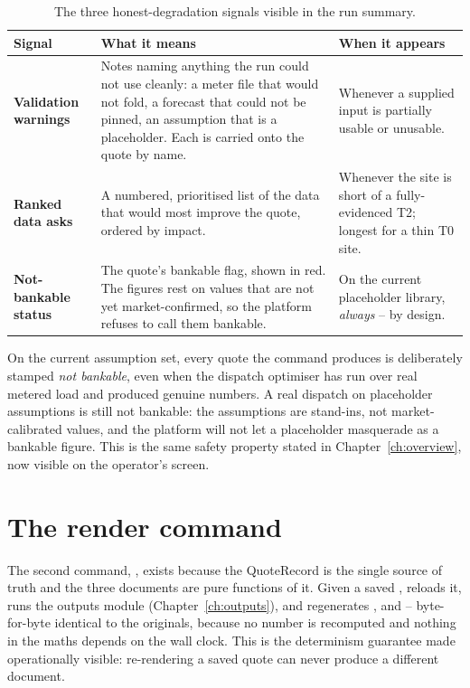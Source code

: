 \begin{table}[H]
\centering
\caption{The three honest-degradation signals visible in the run summary.}
\label{tab:cli-degrade}
\small\sffamily
\begin{tabularx}{\textwidth}{@{}l L L@{}}
\toprule
\textbf{Signal} & \textbf{What it means} & \textbf{When it appears} \\
\midrule
\textbf{Validation warnings} & Notes naming anything the run could not use cleanly: a meter file that would not fold, a forecast that could not be pinned, an assumption that is a placeholder. Each is carried onto the quote by name. & Whenever a supplied input is partially usable or unusable. \\
\textbf{Ranked data asks} & A numbered, prioritised list of the data that would most improve the quote, ordered by impact. & Whenever the site is short of a fully-evidenced T2; longest for a thin T0 site. \\
\textbf{Not-bankable status} & The quote's bankable flag, shown in red. The figures rest on values that are not yet market-confirmed, so the platform refuses to call them bankable. & On the current placeholder library, \emph{always} -- by design. \\
\bottomrule
\end{tabularx}
\end{table}

\begin{keyidea}
On the current  assumption set, every quote the  command produces is deliberately stamped \emph{not bankable}, even when the dispatch optimiser has run over real metered load and produced genuine numbers. A real dispatch on placeholder assumptions is still not bankable: the assumptions are stand-ins, not market-calibrated values, and the platform will not let a placeholder masquerade as a bankable figure. This is the same safety property stated in Chapter~\ref{ch:overview}, now visible on the operator's screen.
\end{keyidea}

\section{The render command}

The second command, , exists because the QuoteRecord is the single source of truth and the three documents are pure functions of it. Given a saved ,  reloads it, runs the outputs module (Chapter~\ref{ch:outputs}), and regenerates ,  and  -- byte-for-byte identical to the originals, because no number is recomputed and nothing in the maths depends on the wall clock. This is the determinism guarantee made operationally visible: re-rendering a saved quote can never produce a different document.


